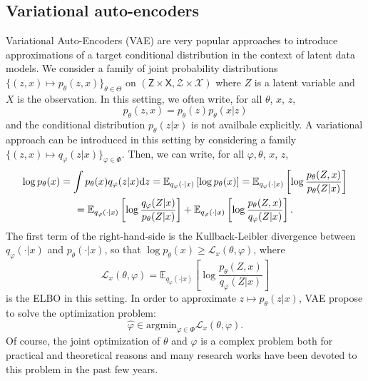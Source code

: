 \documentclass[english,graybox,envcountchap,envcountsame,sectrefs,shortlabels]{svmono}
\theoremstyle{style}
\begin{document}
\subsection{Variational auto-encoders}
Variational Auto-Encoders (VAE) are very popular approaches to introduce approximations of a target conditional distribution in the context of latent data models. We consider a family of joint probability distributions $\{(z,x) \mapsto  p_{\theta}(z,x)\}_{\theta\in\Theta}$ on $(\mathsf{Z}\times \mathsf{X}, \mathcal{Z}\times \mathcal{X})$ where $Z$ is a latent variable and $X$ is the observation. In this setting, we often write, for all $\theta$, $x$, $z$,
$$
p_{\theta}(z,x) = p_{\theta}(z)p_{\theta}(x|z)
$$
and the conditional distribution $p_{\theta}(z|x)$ is not availbale explicitly. A variational approach can be introduced in this setting by considering a family $\{(z,x) \mapsto q_{\varphi}(z|x)\}_{\varphi\in\Phi}$. Then, we can write, for all $\varphi,\theta$, $x$, $z$,
\begin{multline*}
\log p_\theta(x) = \int p_\theta(x) q_{\varphi}(z|x) \mathrm{d} z = \mathbb{E}_{q_{\varphi}(\cdot|x)}\left[\log p_\theta(x)\right] = \mathbb{E}_{q_{\varphi}(\cdot|x)}\left[\log \frac{p_\theta(Z,x)}{p_\theta(Z|x)}\right] \\
= \mathbb{E}_{q_{\varphi}(\cdot|x)}\left[\log \frac{q_{\varphi}(Z|x)}{p_\theta(Z|x)}\right]  + \mathbb{E}_{q_{\varphi}(\cdot|x)}\left[\log \frac{p_\theta(Z,x)}{q_{\varphi}(Z|x)}\right] .
\end{multline*}
The first term of the right-hand-side is the Kullback-Leibler divergence between $q_{\varphi}(\cdot|x)$ and $p_\theta(\cdot|x)$, so that $\log p_\theta(x)\geq \mathcal{L}_x(\theta,\varphi)$, where
$$
\mathcal{L}_x(\theta,\varphi) = \mathbb{E}_{q_{\varphi}(\cdot|x)}\left[\log \frac{p_\theta(Z,x)}{q_{\varphi}(Z|x)}\right]
$$
is the ELBO in this setting. In order to approximate $z\mapsto p_\theta(z|x)$, VAE propose to solve the optimization problem:
$$
\widehat \varphi \in \mathrm{argmin}_{\varphi\in\Phi} \mathcal{L}_x(\theta,\varphi).
$$
Of course, the joint optimization of $\theta$ and $\varphi$ is a complex problem both for practical and theoretical reasons and many research works have been devoted to this problem in the past few years.
\end{document}
